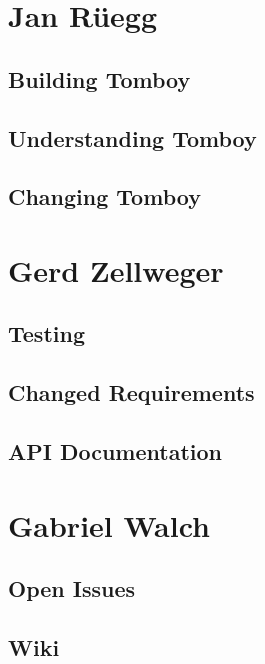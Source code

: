 \documentclass[11pt,a4paper,titlepage]{article}
\begin{document}


\section{Jan Rüegg}

\subsection{Building Tomboy}

\subsection{Understanding Tomboy}

\subsection{Changing Tomboy}

\section{Gerd Zellweger}

\subsection{Testing}

\subsection{Changed Requirements}

\subsection{API Documentation}

\section{Gabriel Walch}

\subsection{Open Issues}

\subsection{Wiki}
\end{document}
